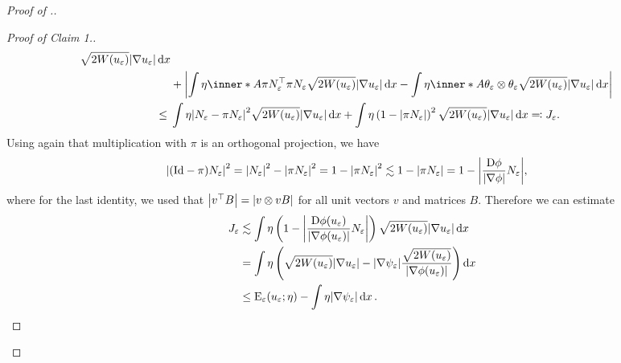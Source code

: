 \begin{proof}[Proof of .]
\begin{proof}[Proof of Claim 1.]
\begin{align*}
{				\sqrt{ 2 W ( u_{ \varepsilon } ) }
				\abs{ \nabla u_{ \varepsilon } }
				\dd{ x }
			}
			\\
			& + 
			\abs{ 
				\int
				\eta
				\inner*{ A }
				{ \pi N_{ \varepsilon }^{ \top } \pi N_{ \varepsilon } }
				\sqrt{ 2 W ( u_{ \varepsilon } ) } \abs{ \nabla u_{ 
						\varepsilon } }
				\dd{ x }
				-
				\int
				\eta
				\inner*{ A }
				{ \theta_{ \varepsilon } \otimes \theta_{ \varepsilon } }
				\sqrt{ 2 W ( u_{ \varepsilon } ) }
				\abs{ \nabla u_{ \varepsilon } }
				\dd{ x }
			}
			\\
			\leq{} & 
			\int
			\eta
			\abs{ N_{ \varepsilon } - \pi N_{ \varepsilon } }^{ 2 }
			\sqrt{ 2 W ( u_{ \varepsilon} ) } \abs{ \nabla u_{ \varepsilon 
			} }
			\dd{ x }
			+
			\int
			\eta
			\left( 
			1 - \abs{ \pi N_{ \varepsilon } }
			\right)^{ 2 }
			\sqrt{ 2 W ( u_{ \varepsilon } ) } \abs{ \nabla u_{ \varepsilon 
			} }
			\dd{ x }
			\eqqcolon J_{ \varepsilon }.
		\end{align*}
		Using again that multiplication with $ \pi $ is an orthogonal 
		projection, we have
		\begin{align*}
			\abs{
				( \mathrm{Id} - \pi ) N_{ \varepsilon }
			}^{ 2 }
			& =
			\abs{ N_{ \varepsilon } }^{ 2 } 
			-
			\abs{ \pi N_{ \varepsilon } }^{ 2 }
			=
			1 - \abs{ \pi N_{ \varepsilon } }^{ 2 }
			\lesssim
			1 - \abs{ \pi N_{ \varepsilon } }
			=
			1 -
			\abs{ \frac{ \mathrm{D} \phi }{ \abs{ \nabla \phi } } N_{ \varepsilon } 
			},
		\end{align*}
		where for the last identity, we used that $ \abs{ v^{ \top } B } = 
		\abs{ v \otimes v B } $ for all unit vectors $ v $ and matrices $ B $.
		Therefore we can estimate
		\begin{align*}
			J_{ \varepsilon }
			& \lesssim
			\int
			\eta
			\left(
			1 - \abs{ \frac{ \mathrm{D} \phi ( u_{ \varepsilon } ) }{ \abs{ \nabla 
			\phi ( u_{ \varepsilon } ) } } N_{ 
					\varepsilon } }
			\right)
			\sqrt{ 2 W ( u_{ \varepsilon } ) }
			\abs{ \nabla u_{ \varepsilon } }
			\dd{ x }
			\\
			& =
			\int
			\eta 
			\left(
			\sqrt{ 2 W ( u_{ \varepsilon } ) }
			\abs{ \nabla u_{ \varepsilon } }
			-
			\abs{ \nabla \psi_{ \varepsilon } }
			\frac{ \sqrt{ 2 W ( u_{ \varepsilon } ) } }{ \abs{ \nabla 
					\phi ( u_{ \varepsilon } ) } }
			\right)
			\dd{ x }
			\\
			& \leq
			\operatorname{E}_{ \varepsilon } ( u_{ \varepsilon } ; \eta )
			-
			\int
			\eta
			\abs{ \nabla \psi_{ \varepsilon } }
			\dd{ x }.
		\end{align*}

\end{proof}
\end{proof}
